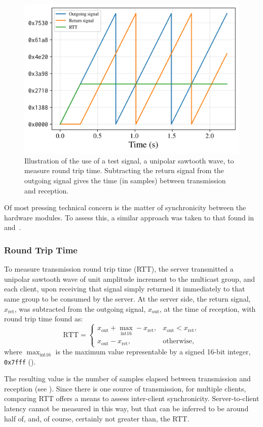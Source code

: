 \begin{figure}[ht]
    \centering
    \includegraphics[width=.5\textwidth]{figures/test-signal}
    \caption{
        Illustration of the use of a test signal, a unipolar sawtooth wave,
        to measure round trip time.
        Subtracting the return signal from the outgoing signal gives the time
        (in samples) between transmission and reception.
    }
    \label{fig:test-signal}
\end{figure}
\noindent
Of most pressing technical concern is the matter of synchronicity between the
hardware modules.
To assess this, a similar approach was taken to that found
in~\citep{rushton_microcontroller-based_2023}
and~\citep{gabrielli_networked_2012}.

\subsubsection{Round Trip Time}
To measure transmission round trip time (RTT), the
server transmitted a unipolar sawtooth wave of unit amplitude increment to the
multicast group, and each client, upon receiving that signal simply returned it
immediately to that same group to be consumed by the server.
At the server side, the return signal, $x_{\text{ret}}$, was subtracted from the
outgoing signal, $x_{\text{out}}$, at the time of reception, with round trip
time found as:
\begin{equation}
    \label{eq:rtt}
    \text{RTT} = \begin{cases}
                     x_{\text{out}} + \max_{\text{int16}} - x_{\text{ret}}, &x_{\text{out}} < x_{\text{ret}}, \\
                     x_{\text{out}} - x_{\text{ret}}, &\text{otherwise},
    \end{cases}
\end{equation}
where $\max_{\text{int16}}$ is the maximum value representable by a
signed 16-bit integer, \texttt{0x7fff} ().

The resulting value is the number of samples elapsed between transmission and
reception (see ).
Since there is one source of transmission, for multiple clients, comparing RTT
offers a means to assess inter-client synchronicity.
Server-to-client latency cannot be measured in this way, but that can be
inferred to be around half of, and, of course, certainly not greater than, the
RTT.\

